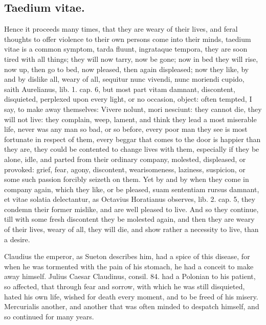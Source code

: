 {\subsection{Taedium vitae.}
Hence it proceeds many times, that they are weary of
their lives, and feral thoughts to offer violence to their own persons
come into their minds, taedium vitae is a common symptom, tarda fluunt,
ingrataque tempora, they are soon tired with all things; they will now
tarry, now be gone; now in bed they will rise, now up, then go to bed,
now pleased, then again displeased; now they like, by and by dislike
all, weary of all, sequitur nunc vivendi, nunc moriendi cupido, saith
Aurelianus, lib. 1. cap. 6, but most part vitam damnant,
discontent, disquieted, perplexed upon every light, or no occasion,
object: often tempted, I say, to make away themselves: Vivere
nolunt, mori nesciunt: they cannot die, they will not live: they
complain, weep, lament, and think they lead a most miserable life,
never was any man so bad, or so before, every poor man they see is most
fortunate in respect of them, every beggar that comes to the door is
happier than they are, they could be contented to change lives with
them, especially if they be alone, idle, and parted from their ordinary
company, molested, displeased, or provoked: grief, fear, agony,
discontent, wearisomeness, laziness, suspicion, or some such passion
forcibly seizeth on them. Yet by and by when they come in company
again, which they like, or be pleased, suam sententiam rursus damnant,
et vitae solatia delectantur, as Octavius Horatianus observes, lib. 2.
cap. 5, they condemn their former mislike, and are well pleased to
live. And so they continue, till with some fresh discontent they be
molested again, and then they are weary of their lives, weary of all,
they will die, and show rather a necessity to live, than a desire.

Claudius the emperor, as Sueton describes him, had a spice of
this disease, for when he was tormented with the pain of his stomach,
he had a conceit to make away himself. Julius Caesar Claudinus, consil.
84. had a Polonian to his patient, so affected, that through fear
and sorrow, with which he was still disquieted, hated his own life,
wished for death every moment, and to be freed of his misery.
Mercurialis another, and another that was often minded to despatch
himself, and so continued for many years.

}
